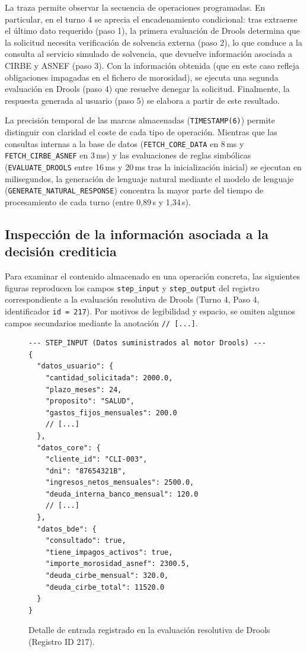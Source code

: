 \documentclass[12pt,a4paper]{report}
\begin{document}
La traza permite observar la secuencia de operaciones programadas. En particular, en el turno 4 se aprecia el encadenamiento condicional: tras extraerse el último dato requerido (paso 1), la primera evaluación de Drools determina que la solicitud necesita verificación de solvencia externa (paso 2), lo que conduce a la consulta al servicio simulado de solvencia, que devuelve información asociada a CIRBE y ASNEF (paso 3). Con la información obtenida (que en este caso refleja obligaciones impagadas en el fichero de morosidad), se ejecuta una segunda evaluación en Drools (paso 4) que resuelve denegar la solicitud. Finalmente, la respuesta generada al usuario (paso 5) se elabora a partir de este resultado.

La precisión temporal de las marcas almacenadas (\texttt{TIMESTAMP(6)}) permite distinguir con claridad el coste de cada tipo de operación. Mientras que las consultas internas a la base de datos (\texttt{FETCH\_CORE\_DATA} en 8\,ms y \texttt{FETCH\_CIRBE\_ASNEF} en 3\,ms) y las evaluaciones de reglas simbólicas (\texttt{EVALUATE\_DROOLS} entre 16\,ms y 20\,ms tras la inicialización inicial) se ejecutan en milisegundos, la generación de lenguaje natural mediante el modelo de lenguaje (\texttt{GENERATE\_NATURAL\_RESPONSE}) concentra la mayor parte del tiempo de procesamiento de cada turno (entre 0{,}89\,s y 1{,}34\,s).

\subsection{Inspección de la información asociada a la decisión crediticia}

Para examinar el contenido almacenado en una operación concreta, las siguientes figuras reproducen los campos \texttt{step\_input} y \texttt{step\_output} del registro correspondiente a la evaluación resolutiva de Drools (Turno 4, Paso 4, identificador \texttt{id = 217}). Por motivos de legibilidad y espacio, se omiten algunos campos secundarios mediante la anotación \texttt{// [...]}.

\begin{figure}[H]
\centering
\begin{minipage}{\textwidth}
\footnotesize
\begin{verbatim}
--- STEP_INPUT (Datos suministrados al motor Drools) ---
{
  "datos_usuario": {
    "cantidad_solicitada": 2000.0,
    "plazo_meses": 24,
    "proposito": "SALUD",
    "gastos_fijos_mensuales": 200.0
    // [...]
  },
  "datos_core": {
    "cliente_id": "CLI-003",
    "dni": "87654321B",
    "ingresos_netos_mensuales": 2500.0,
    "deuda_interna_banco_mensual": 120.0
    // [...]
  },
  "datos_bde": {
    "consultado": true,
    "tiene_impagos_activos": true,
    "importe_morosidad_asnef": 2300.5,
    "deuda_cirbe_mensual": 320.0,
    "deuda_cirbe_total": 11520.0
  }
}
\end{verbatim}
\end{minipage}
\caption{Detalle de entrada registrado en la evaluación resolutiva de Drools (Registro ID 217).}
\label{lst:audit_trace}
\end{figure}
\end{document}
